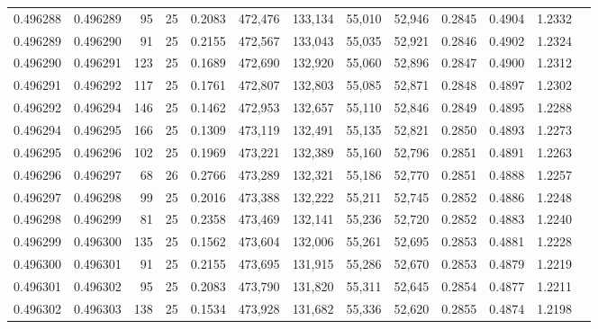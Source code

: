 \begin{tabular}{rrrrrrrrrrrrr}
0.496288 & 0.496289 &    95 &  25 &                                     0.2083 & 472,476 & 133,134 &  55,010 &  52,946 & 0.2845 & 0.4904 & 1.2332 \\
0.496289 & 0.496290 &    91 &  25 &                                     0.2155 & 472,567 & 133,043 &  55,035 &  52,921 & 0.2846 & 0.4902 & 1.2324 \\
0.496290 & 0.496291 &   123 &  25 &                                     0.1689 & 472,690 & 132,920 &  55,060 &  52,896 & 0.2847 & 0.4900 & 1.2312 \\
0.496291 & 0.496292 &   117 &  25 &                                     0.1761 & 472,807 & 132,803 &  55,085 &  52,871 & 0.2848 & 0.4897 & 1.2302 \\
0.496292 & 0.496294 &   146 &  25 &                                     0.1462 & 472,953 & 132,657 &  55,110 &  52,846 & 0.2849 & 0.4895 & 1.2288 \\
0.496294 & 0.496295 &   166 &  25 &                                     0.1309 & 473,119 & 132,491 &  55,135 &  52,821 & 0.2850 & 0.4893 & 1.2273 \\
0.496295 & 0.496296 &   102 &  25 &                                     0.1969 & 473,221 & 132,389 &  55,160 &  52,796 & 0.2851 & 0.4891 & 1.2263 \\
0.496296 & 0.496297 &    68 &  26 &                                     0.2766 & 473,289 & 132,321 &  55,186 &  52,770 & 0.2851 & 0.4888 & 1.2257 \\
0.496297 & 0.496298 &    99 &  25 &                                     0.2016 & 473,388 & 132,222 &  55,211 &  52,745 & 0.2852 & 0.4886 & 1.2248 \\
0.496298 & 0.496299 &    81 &  25 &                                     0.2358 & 473,469 & 132,141 &  55,236 &  52,720 & 0.2852 & 0.4883 & 1.2240 \\
0.496299 & 0.496300 &   135 &  25 &                                     0.1562 & 473,604 & 132,006 &  55,261 &  52,695 & 0.2853 & 0.4881 & 1.2228 \\
0.496300 & 0.496301 &    91 &  25 &                                     0.2155 & 473,695 & 131,915 &  55,286 &  52,670 & 0.2853 & 0.4879 & 1.2219 \\
0.496301 & 0.496302 &    95 &  25 &                                     0.2083 & 473,790 & 131,820 &  55,311 &  52,645 & 0.2854 & 0.4877 & 1.2211 \\
0.496302 & 0.496303 &   138 &  25 &                                     0.1534 & 473,928 & 131,682 &  55,336 &  52,620 & 0.2855 & 0.4874 & 1.2198 \\

\end{tabular}

